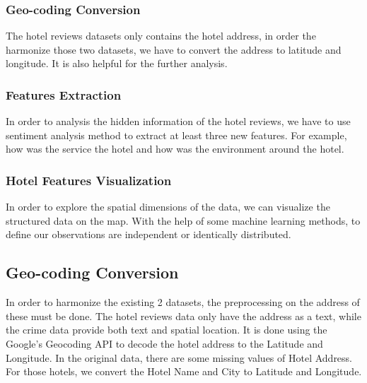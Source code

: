 \documentclass[conference]{IEEEtran}
\begin{document}
\subsubsection{Geo-coding Conversion}
The hotel reviews datasets only contains the hotel address, in order the harmonize those two datasets, we have to convert the address to latitude and longitude. It is also helpful for the further analysis.

\subsubsection{Features Extraction}
In order to analysis the hidden information of the hotel reviews, we have to use sentiment analysis method to extract at least three new features. For example, how was the service the hotel and how was the environment around the hotel.

\subsubsection{Hotel Features Visualization}
In order to explore the spatial dimensions of the data, we can visualize the structured data on the map. With the help of some machine learning methods, to define our observations are independent or identically distributed.

\subsection{Geo-coding Conversion}
In order to harmonize the existing 2 datasets, the preprocessing on the address of these must be done. The hotel reviews data only have the address as a text, while the crime data provide both text and spatial location. It is done using the Google's Geocoding API to decode the hotel address to the Latitude and Longitude. In the original data, there are some missing values of Hotel Address. For those hotels, we convert the Hotel Name and City to Latitude and Longitude.
\end{document}
